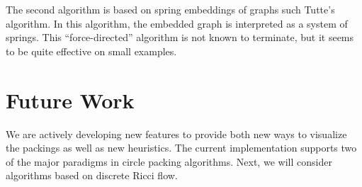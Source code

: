 \documentclass[a4paper,UKenglish]{lipics}
\begin{document}
  The second algorithm is based on spring embeddings of graphs such Tutte's algorithm.
  In this algorithm, the embedded graph is interpreted as a system of springs. 
  This ``force-directed'' algorithm is not known to terminate, but it seems to be quite effective on small examples.


\section{Future Work} %
\label{sec:future_work}

  We are actively developing new features to provide both new ways to visualize the packings as well as new heuristics.
  The current implementation supports two of the major paradigms in circle packing algorithms.
  Next, we will consider algorithms based on discrete Ricci flow.
  
  





%
\end{document}
